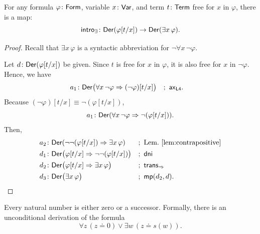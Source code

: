 \begin{lem}
    \label{lem:intro-exists}
    For any formula\/ $\varphi\colon\fun{Form}$, variable\/ $x\colon\fun{Var}$, and term\/ $t\colon\fun{Term}$ free for\/ $x$ in\/ $\varphi$, there is a map:
    \[
        \fun{intro}_\exists\colon
            \fun{Der}(\varphi[t/x])
            \to
            \fun{Der}(\exists x\,\varphi).
    \]
\end{lem}

\begin{proof}
    Recall that $\exists x\,\varphi$ is a syntactic abbreviation for $\neg\forall x\,\neg\varphi$.
    
    Let $d\colon\fun{Der}(\varphi[t/x])$ be given. Since $t$ is free for $x$ in $\varphi$, it is also free for $x$ in $\neg\varphi$. Hence, we have
    \begin{align*}
        a_1&\colon\fun{Der}\bigl(
            \forall x\,\neg\varphi\imp(\neg\varphi)[t/x]
        \bigr)
            &&;\ \fun{ax}_{\fun{L4}}.
    \end{align*}
    Because $(\neg\varphi)[t/x]\equiv\neg(\varphi[t/x])$,
    \[
        a_1\colon\fun{Der}(
            \forall x\,\neg\varphi\imp\neg(\varphi[t/x])
        ).
    \]
    Then,
    {\small
    \begin{align*}
        a_2&\colon\fun{Der}(
            \neg\neg(\varphi[t/x])
            \imp
            \exists x\,\varphi
        )
            &&;\ \text{Lem.~\ref{lem:contrapositive}}\\
        d_1&\colon\fun{Der}\bigl(
            \varphi[t/x]\imp\neg\neg(\varphi[t/x])
        \bigr)
            &&;\ \fun{dni}\\
        d_2&\colon\fun{Der}\bigl(
            \varphi[t/x]\imp\exists x\,\varphi
        \bigr)
            &&;\ \fun{trans}_{\imp}\\
        d_3&\colon\fun{Der}\bigl(
            \exists x\,\varphi
        \bigr)
            &&;\ \fun{mp}(d_2,d).
    \end{align*}}
\end{proof}

\begin{lem}\label{lem:predecesor}
    Every natural number is either zero or a successor. Formally, there is an unconditional derivation of the formula
    \[
        \forall z\,(z\doteq0)\lor\exists w\,(z\doteq s(w)).
    \]
\end{lem}

